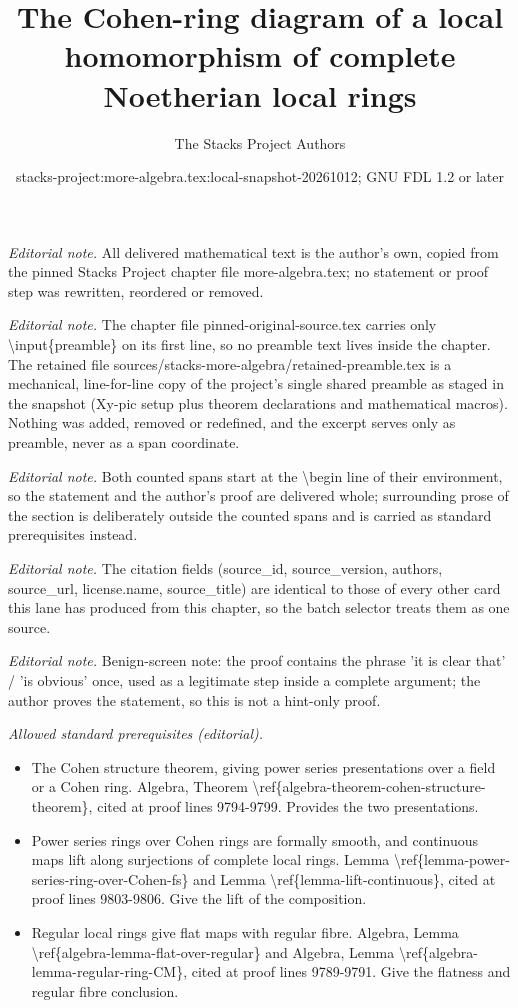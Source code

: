 \documentclass[10pt,a4paper]{amsart}
\title{The Cohen-ring diagram of a local homomorphism of complete Noetherian local rings}
\author{The Stacks Project Authors}
\date{stacks-project:more-algebra.tex:local-snapshot-20261012; GNU FDL 1.2 or later}
\theoremstyle{plain}
\theoremstyle{definition}
\theoremstyle{remark}
\numberwithin{equation}{subsection}
\begin{document}
\maketitle
\setcounter{subsection}{1}
\noindent\textit{Editorial note.} All delivered mathematical text is the author's own, copied from the pinned Stacks Project chapter file more-algebra.tex; no statement or proof step was rewritten, reordered or removed.\par\medskip
\noindent\textit{Editorial note.} The chapter file pinned-original-source.tex carries only \textbackslash{}input\{preamble\} on its first line, so no preamble text lives inside the chapter. The retained file sources/stacks-more-algebra/retained-preamble.tex is a mechanical, line-for-line copy of the project's single shared preamble as staged in the snapshot (Xy-pic setup plus theorem declarations and mathematical macros). Nothing was added, removed or redefined, and the excerpt serves only as preamble, never as a span coordinate.\par\medskip
\noindent\textit{Editorial note.} Both counted spans start at the \textbackslash{}begin line of their environment, so the statement and the author's proof are delivered whole; surrounding prose of the section is deliberately outside the counted spans and is carried as standard prerequisites instead.\par\medskip
\noindent\textit{Editorial note.} The citation fields (source\_id, source\_version, authors, source\_url, license.name, source\_title) are identical to those of every other card this lane has produced from this chapter, so the batch selector treats them as one source.\par\medskip
\noindent\textit{Editorial note.} Benign-screen note: the proof contains the phrase 'it is clear that' / 'is obvious' once, used as a legitimate step inside a complete argument; the author proves the statement, so this is not a hint-only proof.\par\medskip
\noindent\textit{Allowed standard prerequisites (editorial).}\begin{itemize}
\item The Cohen structure theorem, giving power series presentations over a field or a Cohen ring. Algebra, Theorem \textbackslash{}ref\{algebra-theorem-cohen-structure-theorem\}, cited at proof lines 9794-9799. Provides the two presentations.
\item Power series rings over Cohen rings are formally smooth, and continuous maps lift along surjections of complete local rings. Lemma \textbackslash{}ref\{lemma-power-series-ring-over-Cohen-fs\} and Lemma \textbackslash{}ref\{lemma-lift-continuous\}, cited at proof lines 9803-9806. Give the lift of the composition.
\item Regular local rings give flat maps with regular fibre. Algebra, Lemma \textbackslash{}ref\{algebra-lemma-flat-over-regular\} and Algebra, Lemma \textbackslash{}ref\{algebra-lemma-regular-ring-CM\}, cited at proof lines 9789-9791. Give the flatness and regular fibre conclusion.
\end{itemize}\medskip
\end{document}
